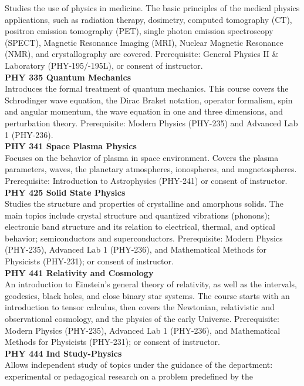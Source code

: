 \documentclass[
  letterpaper,
]{scrbook}
\begin{document}
Studies the use of physics in medicine. The basic principles of the
medical physics applications, such as radiation therapy, dosimetry,
computed tomography (CT), positron emission tomography (PET), single
photon emission spectroscopy (SPECT), Magnetic Resonance Imaging (MRI),
Nuclear Magnetic Resonance (NMR), and crystallography are covered.
Prerequisite: General Physics II \& Laboratory (PHY-195/-195L), or
consent of instructor.\\
\textbf{PHY 335 Quantum Mechanics}\\
Introduces the formal treatment of quantum mechanics. This course covers
the Schrodinger wave equation, the Dirac Braket notation, operator
formalism, spin and angular momentum, the wave equation in one and three
dimensions, and perturbation theory. Prerequisite: Modern Physics
(PHY-235) and Advanced Lab 1 (PHY-236).\\
\textbf{PHY 341 Space Plasma Physics}\\
Focuses on the behavior of plasma in space environment. Covers the
plasma parameters, waves, the planetary atmospheres, ionospheres, and
magnetospheres. Prerequisite: Introduction to Astrophysics (PHY-241) or
consent of instructor.\\
\textbf{PHY 425 Solid State Physics}\\
Studies the structure and properties of crystalline and amorphous
solids. The main topics include crystal structure and quantized
vibrations (phonons); electronic band structure and its relation to
electrical, thermal, and optical behavior; semiconductors and
superconductors. Prerequisite: Modern Physics (PHY-235), Advanced Lab 1
(PHY-236), and Mathematical Methods for Physicists (PHY-231); or consent
of instructor.\\
\textbf{PHY 441 Relativity and Cosmology}\\
An introduction to Einstein's general theory of relativity, as well as
the intervals, geodesics, black holes, and close binary star systems.
The course starts with an introduction to tensor calculus, then covers
the Newtonian, relativistic and observational cosmology, and the physics
of the early Universe. Prerequisite: Modern Physics (PHY-235), Advanced
Lab 1 (PHY-236), and Mathematical Methods for Physicists (PHY-231); or
consent of instructor.\\
\textbf{PHY 444 Ind Study-Physics}\\
Allows independent study of topics under the guidance of the department:
experimental or pedagogical research on a problem predefined by the
\end{document}
